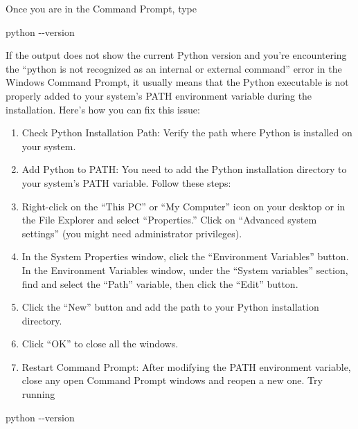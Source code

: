 \documentclass[
]{article}
\newenvironment{Shaded}{\begin{snugshade}}{\end{snugshade}}
\newcommand{\NormalTok}[1]{#1}
\providecommand{\tightlist}{%
  \setlength{\itemsep}{0pt}\setlength{\parskip}{0pt}}
\begin{document}
Once you are in the Command Prompt, type

\begin{Shaded}
\begin{Highlighting}[]
\NormalTok{python {-}{-}version}
\end{Highlighting}
\end{Shaded}

If the output does not show the current Python version and you're
encountering the ``python is not recognized as an internal or external
command'' error in the Windows Command Prompt, it usually means that the
Python executable is not properly added to your system's PATH
environment variable during the installation. Here's how you can fix
this issue:

\begin{enumerate}
\def\labelenumi{\arabic{enumi}.}
\tightlist
\item
  Check Python Installation Path: Verify the path where Python is
  installed on your system.\\
\item
  Add Python to PATH: You need to add the Python installation directory
  to your system's PATH variable. Follow these steps:\\
\item
  Right-click on the ``This PC'' or ``My Computer'' icon on your desktop
  or in the File Explorer and select ``Properties.'' Click on ``Advanced
  system settings'' (you might need administrator privileges).\\
\item
  In the System Properties window, click the ``Environment Variables''
  button. In the Environment Variables window, under the ``System
  variables'' section, find and select the ``Path'' variable, then click
  the ``Edit'' button.\\
\item
  Click the ``New'' button and add the path to your Python installation
  directory.\\
\item
  Click ``OK'' to close all the windows.\\
\item
  Restart Command Prompt: After modifying the PATH environment variable,
  close any open Command Prompt windows and reopen a new one. Try
  running
\end{enumerate}

\begin{Shaded}
\begin{Highlighting}[]
\NormalTok{python {-}{-}version}
\end{Highlighting}
\end{Shaded}
\end{document}
